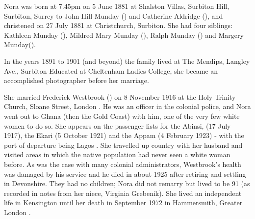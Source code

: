 
Nora was born at 7.45pm on 5 June 1881 at  Shalston Villas, Surbiton Hill,  Surbiton, Surrey to John Hill Munday () and Catherine Aldridge (), and christened on 27 July 1881 at Christchurch, Surbiton.\cite{NoraMundayBirth} 	She had four siblings: Kathleen Munday (), Mildred Mary Munday (), Ralph Munday () and Margery Munday().

In the years  1891 to 1901 (and beyond) the family lived at The Mendips, Langley Ave., Surbiton \cite{NoraMundayResidence}  Educated at Cheltenham Ladies College, she became an accomplished photographer before her marriage.
\cite{NoraMundayOccupation}

She married Frederick Westbrook () on 8 November 1916 at the Holy Trinity Church, Sloane Street, London \cite{NoraMundayMarriage}.  He was an officer in the colonial police, and Nora went out to Ghana (then the Gold Coast) with him, one of the very few white women to do so. She appears on the passenger lists for the Abinsi, (17 July 1917), the Ekari (5 October 1921) and the Appam (4 February 1923) - with the port of departure being Lagos \cite{NoraMundayTravel}. She travelled up country with her husband and visited areas in which the native population had never seen a white woman before. As was the case with many colonial administrators, Westbrook's health was damaged by his service and he died in about 1925 after retiring and settling in Devonshire. They had no children; Nora did not remarry but lived to be 91 (as recorded in notes from her niece, Virginia Grebenik). She lived an independent life in Kensington until her death in September 1972 in 	Hammersmith, Greater London \cite{NoraMundayDeath}.

